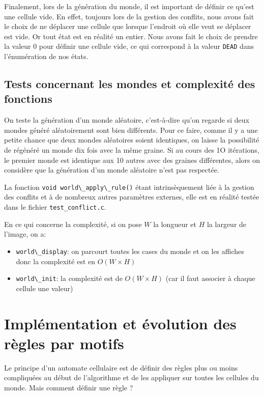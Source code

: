 Finalement, lors de la génération du monde, il est important de définir ce qu'est une cellule vide. En effet, toujours lors de la gestion des conflits, nous avons fait le choix de ne déplacer une cellule que lorsque l'endroit où elle veut se déplacer est vide. Or tout état est en réalité un entier. Nous avons fait le choix de prendre la valeur 0 pour définir une cellule vide, ce qui correspond à la valeur \texttt{DEAD} dans l'énumération de nos états.

\subsection{Tests concernant les mondes et complexité des fonctions} \label{sec:ReglesMotif}

On teste la génération d'un monde aléatoire, c'est-à-dire qu'on regarde si deux mondes généré aléatoirement sont bien différents. Pour ce faire, comme il y a une petite chance que deux mondes aléatoires soient identiques, on laisse la possibilité de régénéré un monde dix fois avec la même graine. Si au cours des 1O itérations, le premier monde est identique aux 10 autres avec des graines différentes, alors on considère que la génération d'un monde aléatoire n'est pas respectée.

La fonction \lstinline{void world\_apply\_rule()} étant intrinsèquement liée à la gestion des conflits et à de nombreux autres paramètres externes, elle est en réalité testée dans le fichier \texttt{test\_conflict.c}.

En ce qui concerne la complexité, si on pose $W$ la longueur et $H$ la largeur de l'image, on a:
\begin{itemize}
    \item \lstinline{world\_display}: on parcourt toutes les cases du monde et on les affiches donc la complexité est en $O(W\times H)$
    \item \lstinline{world\_init}: la complexité est de $O(W\times H)$ (car il faut associer à chaque cellule une valeur)
\end{itemize}

\section{Implémentation et évolution des règles par motifs}

Le principe d'un automate cellulaire est de définir des règles plus ou moins compliquées au début de l'algorithme et de les appliquer sur toutes les cellules du monde. Mais comment définir une règle ?

